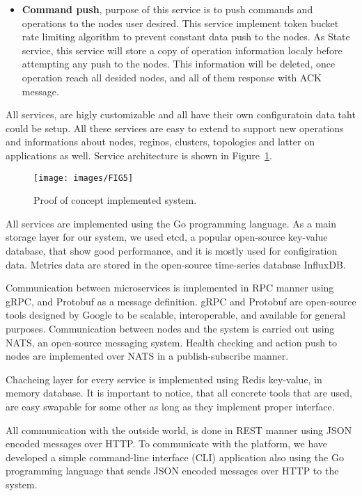 \begin{itemize}
	\item \textbf{Command push}, purpose of this service is to push commands and operations to the nodes user desired. This service implement token bucket rate limiting algorithm to prevent constant data push to the nodes. As State service, this service will store a copy of operation information localy before attempting any push to the nodes. This information will be deleted, once operation reach all desided nodes, and all of them response with ACK message.
\end{itemize}

All services, are higly customizable and all have their own configuratoin data taht could be setup. All these services are easy to extend to support new operations and informations about nodes, reginos, clusters, topologies and latter on applications as well. Service architecture is shown in Figure~\ref{fig:fig11}.

\begin{figure}[!htbp]
	\begin{center}
		\texttt{[image: images/FIG5]}
	\end{center}
	\vspace{-0.9cm}
	\caption{Proof of concept implemented system.}
	\label{fig:fig11}
\end{figure} 

All services are implemented using the Go programming language. As a main storage layer for our system, we used etcd, a popular open-source key-value database, that show good performance, and it is mostly used for configiration data. Metrics data are stored in the open-source time-series database InfluxDB. 

Communication between microservices is implemented in RPC manner using gRPC, and Protobuf as a message definition. gRPC and Protobuf are open-source tools designed by Google to be scalable, interoperable, and available for general purposes. Communication between nodes and the system is carried out using NATS, an open-source messaging system. Health checking and action push to nodes are implemented over NATS in a publish-subscribe manner.

Chacheing layer for every service is implemented using Redis key-value, in memory database. It is important to notice, that all concrete tools that are used, are easy swapable for some other as long as they implement proper interface.

All communication with the outside world, is done in REST manner using JSON encoded messages over HTTP. To communicate with the platform, we have developed a simple command-line interface (CLI) application also using the Go programming language that sends JSON encoded messages over HTTP to the system.

